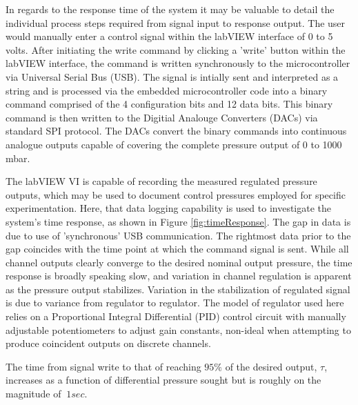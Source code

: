 In regards to the response time of the system it may be valuable to detail the individual process steps required from signal input to response output. The user would manually enter a control signal within the labVIEW interface of 0 to 5 volts. After initiating the write command by clicking a 'write' button within the labVIEW interface, the command is written synchronously to the microcontroller via Universal Serial Bus (USB). The signal is intially sent and interpreted as a string and is processed via the embedded microcontroller code into a binary command comprised of the 4 configuration bits and 12 data bits. This binary command is then written to the Digitial Analouge Converters (DACs) via standard SPI protocol. The DACs convert the binary commands into  continuous analogue outputs capable of covering the complete pressure output of 0 to 1000 mbar.

The labVIEW VI is capable of recording the measured regulated pressure outputs, which may be used to document control pressures employed for specific experimentation. Here, that data logging capability is used to investigate the system's time response, as shown in Figure \vref{fig:timeResponse}. The gap in data is due to use of 'synchronous' USB communication. The rightmost data prior to the gap coincides with the time point at which the command signal is sent. While all channel outputs clearly converge to the desired nominal output pressure, the time response is broadly speaking slow, and variation in channel regulation is apparent as the pressure output stabilizes. Variation in the stabilization of regulated signal is due to variance from regulator to regulator. The model of regulator used here relies on a Proportional Integral Differential (PID) control circuit with manually adjustable potentiometers to adjust gain constants, non-ideal when attempting to produce coincident outputs on discrete channels.

The time from signal write to that of reaching $95\%$ of the desired output, $\tau$, increases as a function of differential pressure sought but is roughly on the magnitude of $~1 sec$. 

